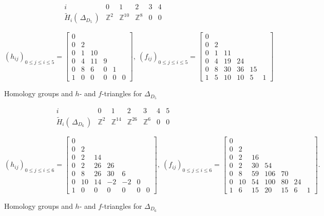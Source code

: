 \documentclass[11pt]{amsart}
\def\ZZ{\mathbb{Z}}
\theoremstyle{plain}
\numberwithin{lemma}{\DefaultNumberTheoremWithin}
\numberwithin{theorem}{\DefaultNumberTheoremWithin}
\numberwithin{corollary}{\DefaultNumberTheoremWithin}
\numberwithin{proposition}{\DefaultNumberTheoremWithin}
\numberwithin{conjecture}{\DefaultNumberTheoremWithin}
\theoremstyle{definition}
\numberwithin{definition}{\DefaultNumberTheoremWithin}
\numberwithin{question}{\DefaultNumberTheoremWithin}
\numberwithin{problem}{\DefaultNumberTheoremWithin}
\theoremstyle{remark}
\numberwithin{remark}{\DefaultNumberTheoremWithin}
\numberwithin{example}{\DefaultNumberTheoremWithin}
\numberwithin{claim}{\DefaultNumberTheoremWithin}
\begin{document}
\begin{figure}[H]
{\small
$$\begin{array}{c|ccccc} i & 0 & 1 & 2 & 3 & 4   \\
\hline
\widetilde{H}_i(\,\Delta_{D_5}\,) & \ZZ^2  & \ZZ^{10} & \ZZ^8 & 0 & 0  
\end{array}$$

$$(h_{ij})_{0 \leq j \leq i \leq 5} = \left[ \begin{array}{cccccc}
0 & & & & &  \\ 0 & 2 & &&&\\ 0 & 1 & 10 &&& \\  0 & 4 & 11 & 9 &&  \\
0 & 8 & 6 & 0 & 1 & \\ 1 & 0& 0& 0& 0&0 
\end{array} \right],\
(f_{ij})_{0 \leq j \leq i \leq 5} = \left[ \begin{array}{cccccc} 
0 & & & & & \\
0 & 2 & & & & \\ 
0 & 1 & 11 & && \\ 
0 & 4 & 19 & 24 & & \\ 
0 & 8 & 30 & 36 & 15 &  \\ 
1 & 5 & 10 & 10 & 5 & 1 
\end{array} \right]$$}
\caption{Homology groups and $h$- and $f$-triangles for $\Delta_{D_5}$}
\label{fig:d5fh}
\end{figure}

\begin{figure}[H]
{\small
$$\begin{array}{c|cccccc} i & 0 & 1 & 2 & 3 & 4 & 5  \\
\hline
\widetilde{H}_i(\,\Delta_{D_6}\,) & \ZZ^2 & \ZZ^{14} & \ZZ^{26} & \ZZ^ 6 & 0 & 0 
\end{array}$$


$$(h_{ij})_{0 \leq j \leq i \leq 6} = \left[ \begin{array}{ccccccc}
0 & & & & & &  \\ 0 & 2 & & & & & \\
0 & 2 & 14 & & & & \\
0 & 2 & 26 & 26 & & &  \\ 0 & 8 & 26 & 30 & 6 & & \\
0 & 10 & 14 & -2 & -2 & 0 & \\
1 & 0& 0&0 &0 &0& 0
\end{array} \right],\
(f_{ij})_{0 \leq j \leq i \leq 6} = \left[ \begin{array}{ccccccc}
0 & & & & & & \\
 0 & 2 & & & & & \\
 0 & 2 & 16 & & & & \\
0 & 2 & 30 & 54 & & & \\
0 & 8 & 59 & 106 & 70 && \\
0 & 10 & 54 & 100 & 80 & 24 & \\ 1 & 6 & 15 & 20 & 15 & 6 & 1 \end{array} \right].$$}
\caption{Homology groups and $h$- and $f$-triangles for $\Delta_{D_6}$}
\label{fig:d6fh}
\end{figure}
  
\end{document}
